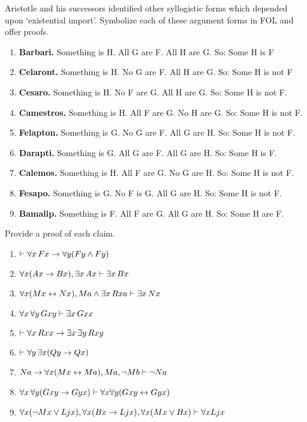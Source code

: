 \problempart
\label{pr.BarbaraEtc.proof2}
Aristotle and his successors identified other syllogistic forms which depended upon `existential import'. Symbolize each of these argument forms in FOL and offer proofs.
\begin{enumerate}
	\item \textbf{Barbari.} Something is H. All G are F. All H are G. So: Some H is F
	\item \textbf{Celaront.} Something is H. No G are F. All H are G. So: Some H is not F
	\item \textbf{Cesaro.} Something is H. No F are G. All H are G. So: Some H is not F.
	\item \textbf{Camestros.} Something is H. All F are G. No H are G. So: Some H is not F.
	\item \textbf{Felapton.} Something is G. No G are F. All G are H. So: Some H is not F.
	\item \textbf{Darapti.} Something is G. All G are F. All G are H. So: Some H is F.
	\item \textbf{Calemos.} Something is H. All F are G. No G are H. So: Some H is not F.
	\item \textbf{Fesapo.} Something is G. No F is G. All G are H. So: Some H is not F.
	\item \textbf{Bamalip.} Something is F. All F are G. All G are H. So: Some H are F.
\end{enumerate}

\problempart
\label{pr.someFOLproofs}
Provide a proof of each claim.
\begin{enumerate}
\item $\vdash \forall x\,\mathord{F}x \rightarrow \forall y(\mathord{F}y \wedge \mathord{F}y)$
\item $\forall x(\mathord{A}x\rightarrow \mathord{B}x), \exists x\,\mathord{A}x \vdash \exists x\,\mathord{B}x$
\item $\forall x(\mathord{M}x \leftrightarrow \mathord{N}x), \mathord{M}a \wedge \exists x\,\mathord{R}xa \vdash \exists x\,\mathord{N}x$
\item $\forall x\, \forall y\,\mathord{G}xy\vdash\exists x\,\mathord{G}xx$
\item $\vdash\forall x\,\mathord{R}xx \rightarrow \exists x\, \exists y\,\mathord{R}xy$
\item $\vdash\forall y\, \exists x (\mathord{Q}y \rightarrow \mathord{Q}x)$
\item $\mathord{N}a \rightarrow \forall x(\mathord{M}x \leftrightarrow \mathord{M}a), \mathord{M}a, \neg\mathord{M}b\vdash \neg \mathord{N}a$
\item $\forall x\, \forall y (\mathord{G}xy \rightarrow \mathord{G}yx) \vdash \forall x\forall y (\mathord{G}xy \leftrightarrow \mathord{G}yx)$
\item $\forall x(\neg\mathord{M}x \vee \mathord{L}jx), \forall x(\mathord{B}x\rightarrow \mathord{L}jx), \forall x(\mathord{M}x\vee \mathord{B}x)\vdash \forall x\mathord{L}jx$
\end{enumerate}


